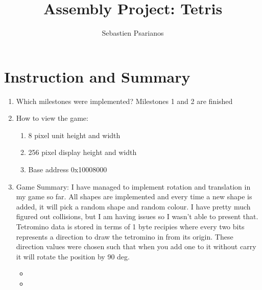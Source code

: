 \documentclass{article}
\title{Assembly Project: Tetris}
\author{Sebastien Psarianos}
\begin{document}
\maketitle

\section{Instruction and Summary}

\begin{enumerate}

    \item Which milestones were implemented?
    Milestones 1 and 2 are finished

    \item How to view the game:

    \begin{enumerate}

    \item 8 pixel unit height and width
    \item 256 pixel display height and width
    \item Base address 0x10008000


    \end{enumerate}


\item Game Summary:
I have managed to implement rotation and translation in my game so far. All shapes are implemented and every time a new shape is added, it will pick a random shape and random colour. I have pretty much figured out collisions, but I am having issues so I wasn't able to present that. Tetromino data is stored in terms of 1 byte recipies where every two bits represents a direction to draw the tetromino in from its origin. These direction values were chosen such that when you add one to it without carry it will rotate the position by 90 deg.
\begin{itemize}
\item
\item
\end{itemize}


\end{enumerate}
\end{document}
